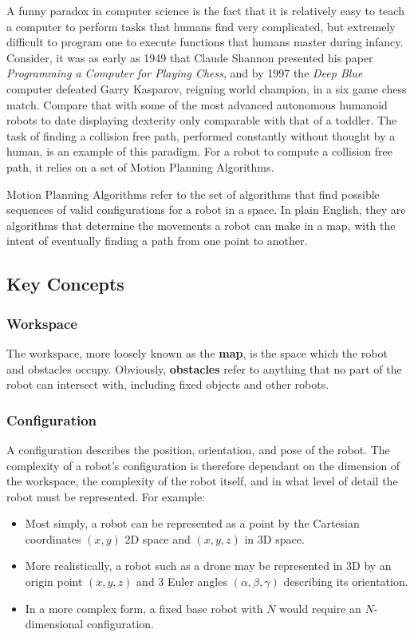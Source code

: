 
A funny paradox in computer science is the fact that it is relatively easy to teach a computer to perform tasks that humans find very complicated, but extremely difficult to program one to execute functions that humans master during infancy. Consider, it was as early as 1949 that Claude Shannon presented his paper \textit{Programming a Computer for Playing Chess}\cite{Shannon1950}, and by 1997 the \textit{Deep Blue} computer defeated Garry Kasparov, reigning world champion, in a six game chess match.\cite{Campbell2002} Compare that with some of the most advanced autonomous humanoid robots to date displaying dexterity only comparable with that of a toddler. The task of finding a collision free path, performed constantly without thought by a human, is an example of this paradigm. For a robot to compute a collision free path, it relies on a set of Motion Planning Algorithms.

Motion Planning Algorithms refer to the set of algorithms that find possible sequences of valid \gls{configuration}s for a robot in a space. In plain English, they are algorithms that determine the movements a robot can make in a map, with the intent of eventually finding a path from one point to another. 

\subsection{Key Concepts}
    \subsubsection{\Gls{Workspace}}
    The \gls{workspace}, more loosely known as the \textbf{map}, is the space which the robot and obstacles occupy. Obviously, \textbf{obstacles} refer to anything that no part of the robot can intersect with, including fixed objects and other robots.
    
    \subsubsection{Configuration}
    A configuration describes the position, orientation, and pose of the robot. The complexity of a robot's configuration is therefore dependant on the dimension of the \gls{workspace}, the complexity of the robot itself, and in what level of detail the robot must be represented. For example:
    \begin{itemize}
        \item Most simply, a robot can be represented as a point by the Cartesian coordinates $(x,y)$ \gls{2D} space and $(x,y,z)$ in \gls{3D} space.
        \item More realistically, a robot such as a drone may be represented in \gls{3D} by an origin point $(x,y,z)$ and 3 Euler angles $(\alpha,\beta,\gamma)$ describing its orientation.
        \item In a more complex form, a fixed base robot with $N$  would require an $N$-dimensional configuration.
    \end{itemize}

